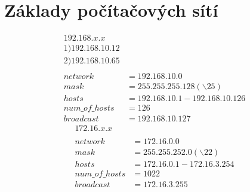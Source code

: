 

\section*{Základy počítačových sítí}

\begin{align*}
    192.168.x.x \\
    1) 192.168.10.12 \\
    2) 192.168.10.65 \\ 
    \\
    network &= 192.168.10.0 \\
    mask &= 255.255.255.128 (\backslash25) \\
    hosts &= 192.168.10.1 - 192.168.10.126 \\
    num\_of\_hosts &= 126 \\
    broadcast &= 192.168.10.127
\end{align*}
\begin{align*}
    172.16.x.x \\
    \\
    network &= 172.16.0.0 \\
    mask &= 255.255.252.0 (\backslash22) \\
    hosts &= 172.16.0.1 - 172.16.3.254 \\
    num\_of\_hosts &= 1022 \\
    broadcast &= 172.16.3.255
\end{align*}
